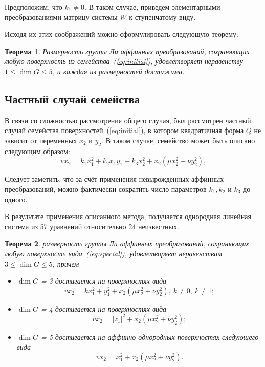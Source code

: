 \documentclass[a4paper,14pt]{extarticle}
\newtheorem{theorem}{Теорема}
\begin{document}
Предположим, что $k_1 \ne 0 $. В таком случае, приведем элементарными преобразованиями матрицу системы $W$ к ступенчатому виду. 

Исходя их этих соображений можно сформулировать следующую теорему: 
\begin{theorem} Размерность группы Ли аффинных преобразований, сохраняющих любую поверхность из семейства~(\ref{eq:initial}), удовлетворяет неравенству $1 \le \dim G \le 5$, и каждая из размерностей достижима.
\end{theorem}

\subsection{Частный случай семейства}
В связи со сложностью рассмотрения общего случая, был рассмотрен частный случай семейства поверхностей~(\ref{eq:initial}), в котором квадратичная форма $Q$ не зависит от переменных $x_2$ и $y_2$. В таком случае, семейство может быть описано следующим образом:
\begin{equation}\label{eq:special}
v x_2 = k_1 x_1^2 + k_2 x_1 y_1 + k_3 x_2^2 + x_2 (\mu x_2^2 + \nu y_2^2),
\end{equation}

Следует заметить, что за счёт применения невырожденных аффинных преобразований, можно фактически сократить число параметров $k_1, k_2$ и $k_3$ до одного.

В результате применения описанного метода, получается однородная линейная система из 57 уравнений относительно 24 неизвестных.

\begin{theorem} размерность группы Ли аффинных преобразований, сохраняющих любую поверхность вида~(\ref{eq:special}), удовлетворяет неравенствам
$3 \le \dim G \le 5$, причем
\begin{itemize}
	\item $\dim G$ = 3 достигается на поверхностях вида
	\begin{equation}\label{eq:special_3}
		v x_2 = k x_1^2 + y_1^2 + x_2 (\mu x_2^2 + \nu y_2^2),\ k \ne 0, \ k \ne 1;
	\end{equation}
	\item $\dim G$ = 4 достигается на поверхностях вида
	\begin{equation}\label{eq:special_4}
		v x_2 = |z_1|^2 + x_2 (\mu x_2^2 + \nu y_2^2);
	\end{equation}
		\item $\dim G$ = 5 достигается на аффинно-однородных поверхностях следующего вида
	\begin{equation}\label{eq:special_5}
		v x_2 = x_1^2 + x_2 (\mu x_2^2 + \nu y_2^2).
	\end{equation}
\end{itemize}
\end{theorem}
\end{document}

